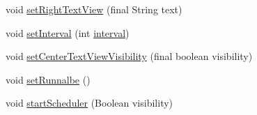 \begin{DoxyCompactItemize}
\item 
void \hyperlink{classpt_1_1lsts_1_1asa_1_1fragments_1_1ManualIndicatorsFragment_a8ace88259f4b5a3131a6ae31a27ad20b}{set\+Right\+Text\+View} (final String text)
\item 
void \hyperlink{classpt_1_1lsts_1_1asa_1_1fragments_1_1ManualIndicatorsFragment_afb9478d381936437217dfddd54b2d83c}{set\+Interval} (int \hyperlink{classpt_1_1lsts_1_1asa_1_1fragments_1_1ManualIndicatorsFragment_a5c9aaf2da9fdecdc1e8544ac75e00a91}{interval})
\item 
void \hyperlink{classpt_1_1lsts_1_1asa_1_1fragments_1_1ManualIndicatorsFragment_a328f1be55fb654aa3c4347e2d114038b}{set\+Center\+Text\+View\+Visibility} (final boolean visibility)
\item 
void \hyperlink{classpt_1_1lsts_1_1asa_1_1fragments_1_1ManualIndicatorsFragment_ab41bafe18b8113b7f9f817d5f61f5834}{set\+Runnalbe} ()
\item 
void \hyperlink{classpt_1_1lsts_1_1asa_1_1fragments_1_1ManualIndicatorsFragment_a1ee3cd2af1522949299d1f97c5451ee9}{start\+Scheduler} (Boolean visibility)
\end{DoxyCompactItemize}
